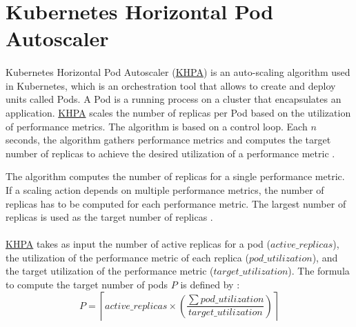 \section{Kubernetes Horizontal Pod Autoscaler}
\label{sec:04_background_khpa}
\paragraph{}
Kubernetes Horizontal Pod Autoscaler (\hyperlink{abbr:khpa}{KHPA}) is an auto-scaling algorithm used in Kubernetes, which is an orchestration tool that allows to create and deploy units called Pods. A Pod is a running process on a cluster that encapsulates an application.
\hyperlink{abbr:khpa}{KHPA} scales the number of replicas per Pod based on the utilization of performance metrics.
The algorithm is based on a control loop. Each $n$ seconds, the algorithm gathers performance metrics and computes the target number of replicas to achieve the desired utilization of a performance metric \cite{Casalicchio2017AutoScaleCont}.


The algorithm computes the number of replicas for a single performance metric. If a scaling action depends on multiple performance metrics, the number of replicas has to be computed for each performance metric. The largest number of replicas is used as the target number of replicas \cite{Kubernetes2021Docs}.


\paragraph{}
\hyperlink{abbr:khpa}{KHPA} takes as input the number of active replicas for a pod ($active\_replicas$), the utilization of the performance metric of each replica ($pod\_utilization$), and the target utilization of the performance metric ($target\_utilization$).
The formula to compute the target number of pods $P$ is defined by \cite{Kubernetes2021Docs}:
\begin{equation}
P = \left \lceil active\_replicas \times \left ( \frac{\sum pod\_utilization}{target\_utilization} \right ) \right \rceil
\label{eq:04_background_khpa_equation}
\end{equation}

